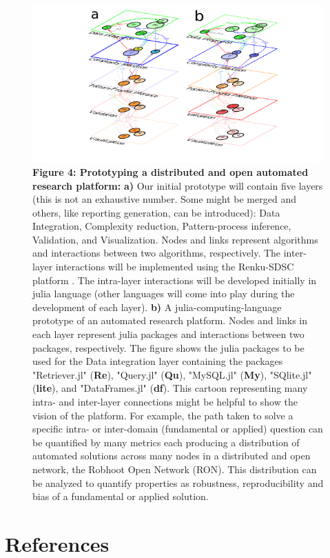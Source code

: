 \documentclass[authoryear,1p,12pt]{elsarticle}
\begin{document}
\begin{figure}[htp]
  \centering
  \includegraphics[]{Figure4}
	\caption{
		\textbf{Figure 4: Prototyping a distributed and open automated research
    platform:} {\bf a)} Our initial prototype will contain five
  layers (this is not an exhaustive number. Some might be merged
  and others, like reporting generation, can be introduced): Data
  Integration, Complexity reduction, Pattern-process inference,
  Validation, and Visualization. Nodes and links represent
  algorithms and interactions between two algorithms,
  respectively. The inter-layer interactions will be implemented
  using the Renku-SDSC
  platform \cite{Renku}. The
  intra-layer interactions will be developed initially in julia
  language (other languages will come into play during the
  development of each layer). {\bf b)} A julia-computing-language
  prototype of an automated research platform. Nodes and links in
  each layer represent julia packages and interactions between
  two packages, respectively. The figure shows the julia packages
  to be used for the Data integration layer containing the
  packages "Retriever.jl" ({\bf Re}), "Query.jl" ({\bf Qu}),
  "MySQL.jl" ({\bf My}), "SQlite.jl" ({\bf lite}), and
  "DataFrames.jl" ({\bf df}). This cartoon representing many
  intra- and inter-layer connections might be helpful to show the
  vision of the platform. For example, the path taken to solve a
  specific intra- or inter-domain (fundamental or applied)
  question can be quantified by many metrics each producing a
  distribution of automated solutions across many nodes in a
  distributed and open network, the Robhoot Open Network
  (RON). This distribution can be analyzed to quantify properties
  as robustness, reproducibility and bias of a fundamental or
  applied solution.
		}
	\label{fig:4}
\end{figure}

\pagebreak
\section*{References}


\end{document}
